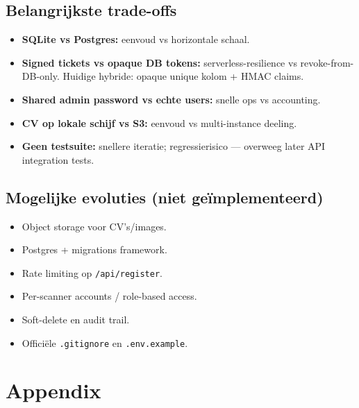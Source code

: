 \documentclass[11pt,a4paper]{report}
\begin{document}
\section{Belangrijkste trade-offs}
\begin{itemize}[leftmargin=*]
  \item \textbf{SQLite vs Postgres:} eenvoud vs horizontale schaal.
  \item \textbf{Signed tickets vs opaque DB tokens:} serverless-resilience vs revoke-from-DB-only.
    Huidige hybride: opaque unique kolom + HMAC claims.
  \item \textbf{Shared admin password vs echte users:} snelle ops vs accounting.
  \item \textbf{CV op lokale schijf vs S3:} eenvoud vs multi-instance deeling.
  \item \textbf{Geen testsuite:} snellere iteratie; regressierisico --- overweeg later API integration tests.
\end{itemize}

\section{Mogelijke evoluties (niet geïmplementeerd)}
\begin{itemize}[leftmargin=*]
  \item Object storage voor CV's/images.
  \item Postgres + migrations framework.
  \item Rate limiting op \texttt{/api/register}.
  \item Per-scanner accounts / role-based access.
  \item Soft-delete en audit trail.
  \item Officiële \texttt{.gitignore} en \texttt{.env.example}.
\end{itemize}

\chapter{Appendix}
\end{document}
